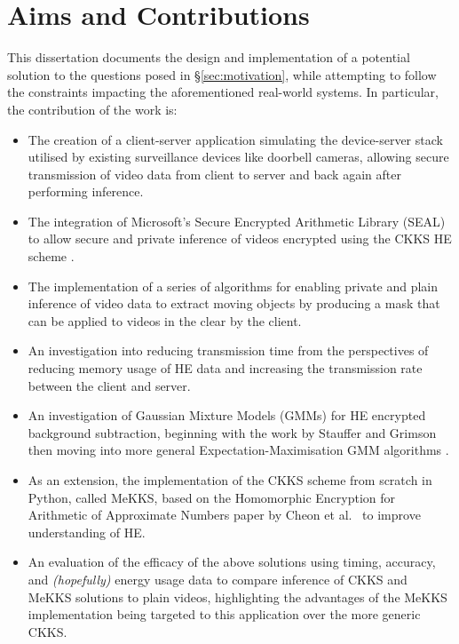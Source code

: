\setlength{\leftskip}{0cm}


\section{Aims and Contributions}
\label{sec:aimsAndContributions}
\setlength{\leftskip}{0.25cm}
\indent \indent
This dissertation documents the design and implementation of a potential solution to the questions posed in §\ref{sec:motivation}, while attempting to follow the constraints impacting the aforementioned real-world systems. In particular, the contribution of the work is:
\begin{itemize}
    \item The creation of a client-server application simulating the device-server stack utilised by existing surveillance devices like doorbell cameras, allowing secure transmission of video data from client to server and back again after performing inference.
    \item The integration of Microsoft's Secure Encrypted Arithmetic Library (SEAL) \cite{SEAL} to allow secure and private inference of videos encrypted using the CKKS HE scheme \cite{CKKS}.
    \item The implementation of a series of algorithms for enabling private and plain inference of video data to extract moving objects by producing a mask that can be applied to videos in the clear by the client.
    \item An investigation into reducing transmission time from the perspectives of reducing memory usage of HE data and increasing the transmission rate between the client and server.
    \item An investigation of Gaussian Mixture Models (GMMs) for HE encrypted background subtraction, beginning with the work by Stauffer and Grimson \cite{Stauffer} then moving into more general Expectation-Maximisation GMM algorithms \cite{Dempster}.
    \item As an extension, the implementation of the CKKS scheme from scratch in Python, called MeKKS, based on the Homomorphic Encryption for Arithmetic of Approximate Numbers paper by Cheon et al.\ \cite{CKKS,BootstrappingHEAAN} to improve understanding of HE.
    \item An evaluation of the efficacy of the above solutions using timing, accuracy, and \textit{(hopefully)} energy usage data to compare inference of CKKS and MeKKS solutions to plain videos, highlighting the advantages of the MeKKS implementation being targeted to this application over the more generic CKKS.
\end{itemize}

\setlength{\leftskip}{0cm}
